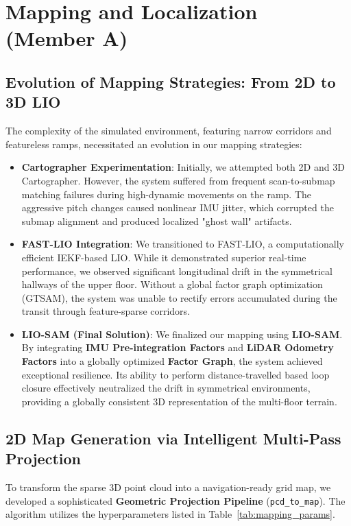 \documentclass[11pt, a4paper]{article}
\begin{document}
\section{Mapping and Localization (Member A)}
\subsection{Evolution of Mapping Strategies: From 2D to 3D LIO}
The complexity of the simulated environment, featuring narrow corridors and featureless ramps, necessitated an evolution in our mapping strategies:
\begin{itemize}
    \item \textbf{Cartographer Experimentation}: Initially, we attempted both 2D and 3D Cartographer. However, the system suffered from frequent scan-to-submap matching failures during high-dynamic movements on the ramp. The aggressive pitch changes caused nonlinear IMU jitter, which corrupted the submap alignment and produced localized "ghost wall" artifacts.
    \item \textbf{FAST-LIO Integration}: We transitioned to FAST-LIO, a computationally efficient IEKF-based LIO. While it demonstrated superior real-time performance, we observed significant longitudinal drift in the symmetrical hallways of the upper floor. Without a global factor graph optimization (GTSAM), the system was unable to rectify errors accumulated during the transit through feature-sparse corridors.
    \item \textbf{LIO-SAM (Final Solution)}: We finalized our mapping using \textbf{LIO-SAM}. By integrating \textbf{IMU Pre-integration Factors} and \textbf{LiDAR Odometry Factors} into a globally optimized \textbf{Factor Graph}, the system achieved exceptional resilience. Its ability to perform distance-travelled based loop closure effectively neutralized the drift in symmetrical environments, providing a globally consistent 3D representation of the multi-floor terrain.
\end{itemize}

\subsection{2D Map Generation via Intelligent Multi-Pass Projection}
To transform the sparse 3D point cloud into a navigation-ready grid map, we developed a sophisticated \textbf{Geometric Projection Pipeline} (\texttt{pcd\_to\_map}). The algorithm utilizes the hyperparameters listed in Table~\ref{tab:mapping_params}.
\end{document}
